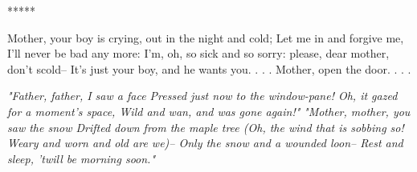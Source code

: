 \begin{poemblock}
  *****

 Mother, your boy is crying, out in the night and cold;
  Let me in and forgive me, I'll never be bad any more:
 I'm, oh, so sick and so sorry:  please, dear mother, don't scold--
  It's just your boy, and he wants you. . . .  Mother, open the door. . . .

\textit{
  "Father, father, I saw a face
   Pressed just now to the window-pane!
  Oh, it gazed for a moment's space,
   Wild and wan, and was gone again!"
}
\textit{
  "Mother, mother, you saw the snow
   Drifted down from the maple tree
  (Oh, the wind that is sobbing so!
   Weary and worn and old are we)--
  Only the snow and a wounded loon--
  Rest and sleep, 'twill be morning soon."
}
\end{poemblock}
